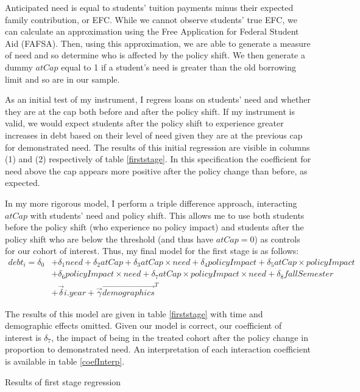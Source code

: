 \documentclass[12pt]{article}
\newcommand{\regs}{../Analysis/Regressions/Output/}
\begin{document}
	Anticipated need is equal to students' tuition payments minus their expected family contribution, or EFC. While we cannot observe students' true EFC, we can calculate an approximation using the Free Application for Federal Student Aid (FAFSA). Then, using this approximation, we are able to generate a measure of need and so determine who is affected by the policy shift. We then generate a dummy $atCap$ equal to 1 if a student's need is greater than the old borrowing limit and so are in our sample. 
	
	As an initial test of my instrument, I regress loans on students' need and whether they are at the cap both before and after the policy shift. If my instrument is valid, we would expect students after the policy shift to experience greater increases in debt based on their level of need given they are at the previous cap for demonstrated need. The results of this initial regression are visible in columns (1) and (2) respectively of table \ref{firststage}. In this specification the coefficient for need above the cap appears more positive after the policy change than before, as expected. 
	
	In my more rigorous model, I perform a triple difference approach, interacting $atCap$ with students' need and policy shift. This allows me to use both students before the policy shift (who experience no policy impact) and students after the policy shift who are below the threshold (and thus have $atCap = 0$) as controls for our cohort of interest. Thus, my final model for the first stage is as follows: 
	\begin{align*}
	debt_i = \delta_0 &+ \delta_1 need + \delta_2 atCap + \delta_3 atCap \times need + \delta_4 policyImpact + \delta_5 atCap \times policyImpact\\
	 &+ \delta_6 policyImpact \times need + \delta_7 atCap \times policyImpact \times need + \delta_8 fallSemester \\
	 &+ \vec{\delta} i.year + \vec{\gamma} \vec{demographics}^T
	 \end{align*} 
	 
	 The results of this model are given in table \ref{firststage} with time and demographic effects omitted. Given our model is correct, our coefficient of interest is $\delta_7$, the impact of being in the treated cohort after the policy change in proportion to demonstrated need. An interpretation of each interaction coefficient is available in table \ref{coefInterp}.
	 
	 \begin{table}
	 	\centering
	 	\caption{Results of first stage regression}	 	
	 	
	 	\label{firststage}
	 \end{table}
	
\end{document}
